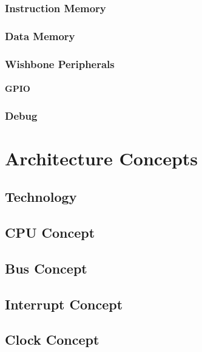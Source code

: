\subsection{Instruction Memory}

\subsection{Data Memory}

\subsection{Wishbone Peripherals}
\subsubsection{GPIO}

\subsection{Debug}


\chapter{Architecture Concepts}



\section{Technology}

\section{CPU Concept}





\section{Bus Concept}


\section{Interrupt Concept}

\section{Clock Concept}

